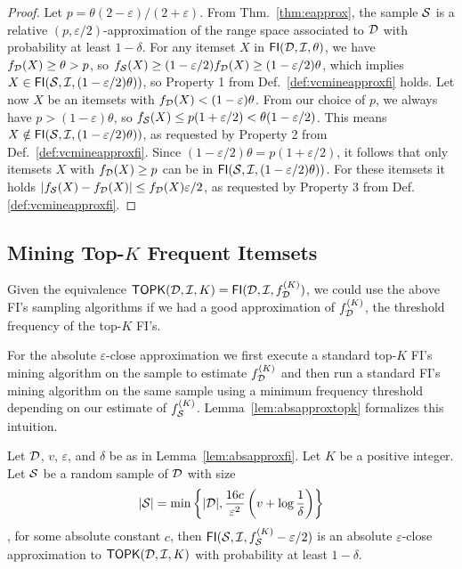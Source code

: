 \begin{proof}
  Let $p=\theta(2-\varepsilon)/(2+\varepsilon)$. From
  Thm.~\ref{thm:eapprox}, the sample ${\cal S}$ is a relative
  $(p,\varepsilon/2)$-approximation of the range space associated to ${\cal D}$ with
  probability at least $1-\delta$. For any itemset $X$ in
  $\mathsf{FI}({\cal D},{\cal I},\theta)$, we have $f_{\cal D}(X)\ge\theta>p$, so
  $f_{\cal S}(X)\ge (1-\varepsilon/2)f_{\cal D}(X)\ge(1-\varepsilon/2)\theta$, which
  implies $X\in\mathsf{FI}({\cal S},{\cal I},(1-\varepsilon/2)\theta))$, so Property 1
  from Def.~\ref{def:vcmineapproxfi} holds. Let now $X$ be an itemsets with
  $f_{\cal D}(X)< (1-\varepsilon)\theta$. From our choice of $p$, we always have
  $p>(1-\varepsilon)\theta$, so $f_{\cal S}(X)\le p(1+\varepsilon/2) <
  \theta(1-\varepsilon/2)$. This means
  $X\notin\mathsf{FI}({\cal S},{\cal I},(1-\varepsilon/2)\theta))$, as requested by
  Property 2 from Def.~\ref{def:vcmineapproxfi}. 
  Since $(1-\varepsilon/2)\theta=p(1+\varepsilon/2)$, it follows
  that only itemsets $X$ with $f_{\cal D}(X)\ge p$ can be in
  $\mathsf{FI}({\cal S},{\cal I},(1-\varepsilon/2)\theta))$. For these itemsets it holds
  $|f_{\cal S}(X)-f_{\cal D}(X)|\le f_{\cal D}(X)\varepsilon/2$, as requested by
  Property 3 from Def.\ref{def:vcmineapproxfi}.
\end{proof}

\subsection{Mining Top-$K$ Frequent Itemsets}\label{sec:vcmineminingtopk}
Given the equivalence
$\mathsf{TOPK}({\cal D},{\cal I},K)=\mathsf{FI}({\cal D},{\cal I},f^{(K)}_{\cal D})$, we could use the above
FI's sampling algorithms if we had a good approximation of $f^{(K)}_{\cal D}$, the
threshold frequency of the top-$K$ FI's.

For the absolute $\varepsilon$-close approximation we first execute a standard
top-$K$ FI's mining algorithm on the sample to estimate $f^{(K)}_{\cal D}$ and then
run a standard FI's mining algorithm on the same sample using a minimum frequency
threshold depending on our estimate of $f_{\cal S}^{(K)}$.
Lemma~\ref{lem:absapproxtopk} formalizes this intuition.

\begin{lemma}\label{lem:absapproxtopk}
  Let ${\cal D}$, $v$, $\varepsilon$, and $\delta$ be as in Lemma~\ref{lem:absapproxfi}.
  Let $K$ be a positive integer. Let ${\cal S}$ be a random sample of ${\cal D}$ with
  size
  \[
  |{\cal S}|=\min\left\{|{\cal D}|,\frac{16c}{\varepsilon^2}\left(v+\log\frac{1}{\delta}\right)\right\}\],
  for some absolute constant $c$, then $\mathsf{FI}({\cal S},{\cal I},f_{\cal S}^{(K)}-\varepsilon/2)$ is an absolute
  $\varepsilon$-close approximation to $\mathsf{TOPK}({\cal D},{\cal I},K)$ with probability at
  least $1-\delta$.
\end{lemma}

